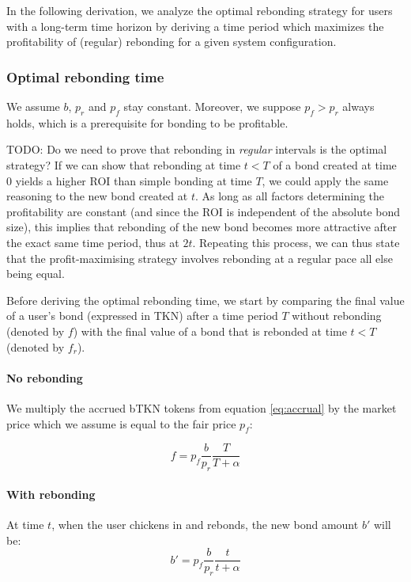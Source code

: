 \documentclass{article}
\begin{document}
In the following derivation, we analyze the optimal rebonding strategy for users with a long-term time horizon by deriving a time period which maximizes the profitability of (regular) rebonding for a given system configuration.

\subsubsection{Optimal rebonding time}
  \label{sec:T_OP}
We assume $b$, $p_r$ and $p_f$ stay constant. Moreover, we suppose $p_f>p_r$ always holds, which is a prerequisite for bonding to be profitable. 

TODO: Do we need to prove that rebonding in \textit{regular} intervals is the optimal strategy? If we can show that rebonding at time $t<T$ of a bond created at time 0 yields a higher ROI than simple bonding at time $T$, we could apply the same reasoning to the new bond created at $t$. As long as all factors determining the profitability are constant (and since the ROI is independent of the absolute bond size), this implies that rebonding of the new bond becomes more attractive after the exact same time period, thus at $2t$. Repeating this process, we can thus state that the profit-maximising strategy involves rebonding at a regular pace all else being equal.

Before deriving the optimal rebonding time, we start by comparing the final value of a user's bond (expressed in TKN) after a time period $T$ without rebonding (denoted by $f$) with the final value of a bond that is rebonded at time $t<T$ (denoted by $f_r$).

\paragraph{No rebonding}
We multiply the accrued bTKN tokens from equation \ref{eq:accrual} by the market price which we assume is equal to the fair price $p_f$:

\begin{equation}
  \label{eq:o-s}
f = p_f\frac{b}{p_r}\frac{T}{T+\alpha}
\end{equation}

\paragraph{With rebonding}
At time $t$, when the user chickens in and rebonds, the new bond amount $b'$ will be:
\begin{equation}
b'= p_f\frac{b}{p_r}\frac{t}{t+\alpha}
\end{equation}
\end{document}
